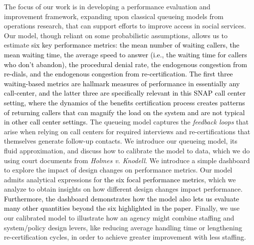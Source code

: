\documentclass[manuscript,screen,authorversion]{acmart}
\newcommand{\rev}[1]{\textcolor{black}{#1}}
\begin{document}
The focus of our work is in developing a performance evaluation and improvement framework, expanding upon classical queueing models from operations research, that can support efforts to  improve access in social services. Our model, though reliant on some probabilistic assumptions, allows us to estimate \rev{six key performance metrics: the mean number of waiting callers, the mean waiting time, the average speed to answer (i.e., the waiting time for callers who don't abandon), the procedural denial rate, the endogenous congestion from re-dials, and the endogenous congestion from re-certification. The first three waiting-based metrics are hallmark measures of performance in essentially any call-center, and the latter three are specifically relevant in this SNAP call center setting, where the dynamics of the benefits certification process creates patterns of returning callers that can magnify the load on the system and are not typical in other call center settings.}
The queueing model captures the \textit{feedback loops} that arise when relying on call centers for required interviews and re-certifications that themselves generate follow-up contacts. %
We introduce our queueing model, its fluid approximation, and discuss how to calibrate the model to data, which we do using court documents from \textit{Holmes v. Knodell}. We introduce a simple dashboard to explore the impact of design changes on performance metrics. Our model admits analytical expressions for \rev{the six focal performance metrics}, which we analyze to obtain insights on how different design changes impact performance. \rev{Furthermore, the dashboard demonstrates how the model also lets us evaluate many other quantities beyond the six highlighted in the paper.} Finally, we use our calibrated model to illustrate how an agency might combine staffing and system/policy design levers, like reducing average handling time or lengthening re-certification cycles, in order to achieve greater improvement with less staffing. 

\end{document}

